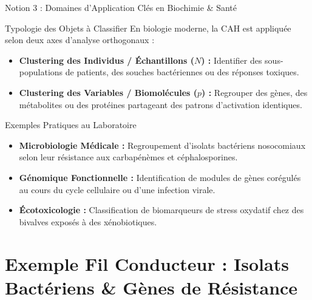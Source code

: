 \documentclass[aspectratio=169,10pt]{beamer}
\begin{document}
\begin{frame}{Notion 3 : Domaines d'Application Clés en Biochimie \& Santé}
  \begin{conceptbox}{Typologie des Objets à Classifier}
    \footnotesize
    En biologie moderne, la CAH est appliquée selon deux axes d'analyse orthogonaux :
    \begin{itemize}
      \item \textbf{Clustering des Individus / Échantillons ($N$) :} Identifier des sous-populations de patients, des souches bactériennes ou des réponses toxiques.
      \item \textbf{Clustering des Variables / Biomolécules ($p$) :} Regrouper des gènes, des métabolites ou des protéines partageant des patrons d'activation identiques.
    \end{itemize}
  \end{conceptbox}
  \vspace{1mm}
  \begin{biobox}{Exemples Pratiques au Laboratoire}
    \footnotesize
    \begin{itemize}
      \item \textbf{Microbiologie Médicale :} Regroupement d'isolats bactériens nosocomiaux selon leur résistance aux carbapénèmes et céphalosporines.
      \item \textbf{Génomique Fonctionnelle :} Identification de modules de gènes corégulés au cours du cycle cellulaire ou d'une infection virale.
      \item \textbf{Écotoxicologie :} Classification de biomarqueurs de stress oxydatif chez des bivalves exposés à des xénobiotiques.
    \end{itemize}
  \end{biobox}
\end{frame}

\section{Exemple Fil Conducteur : Isolats Bactériens \& Gènes de Résistance}
\end{document}
